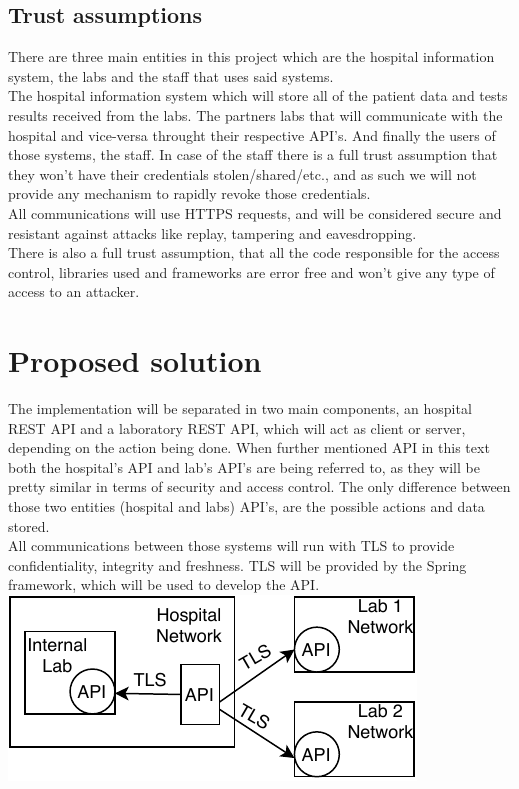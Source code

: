 \subsection{Trust assumptions}


There are three main entities in this project which are the hospital information system, the labs and the staff that uses said systems. \\

The hospital information system which will store all of the patient data and tests results received from the labs. The partners labs that will communicate with the hospital and vice-versa throught their respective API's. And finally the users of those systems, the staff. In case of the staff there is a full trust assumption that they won't have their credentials stolen/shared/etc., and as such we will not provide any mechanism to rapidly revoke those credentials. \\

All communications will use HTTPS requests, and will be considered secure and resistant against attacks like replay, tampering and eavesdropping. \\

There is also a full trust assumption, that all the code responsible for the access control, libraries used and frameworks are error free and won't give any type of access to an attacker. \\


\section{Proposed solution}

The implementation will be separated in two main components, an hospital REST API and a laboratory REST API, which will act as client or server, depending on the action being done. When further mentioned API in this text both the hospital's API and lab's API's are being referred to, as they will be pretty similar in terms of security and access control. The only difference between those two entities (hospital and labs) API's, are the possible actions and data stored. \\

All communications between those systems will run with TLS to provide confidentiality, integrity and freshness. TLS will be provided by the Spring framework, which will be used to develop the API. \\

	\includegraphics[width=.4\textwidth]{figs/infrastructure.pdf}
	

